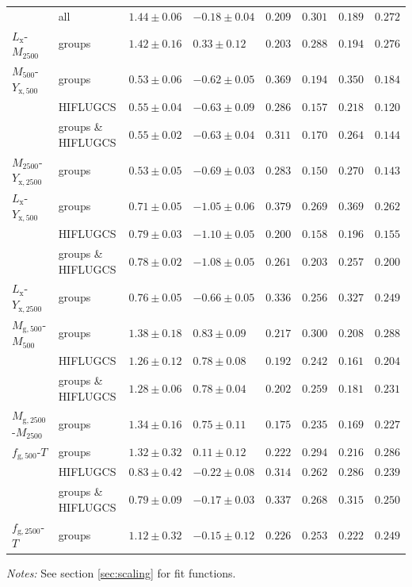 \documentclass[structabstract]{aa}
\begin{document}
\begin{table}
\begin{threeparttable}
\begin{center}
\begin{tabularx}{\linewidth}{X X XXllll}
 & all & $1.44 \pm 0.06$ & $-0.18 \pm 0.04$ & $0.209$ & $0.301$ & $0.189$ & $0.272$ \\ 
$L_{\text{x}}$-$M_{2500}$ & groups & $1.42 \pm 0.16$ & $0.33 \pm 0.12$ & $0.203$ & $0.288$ & $0.194$ & $0.276$ \\ \hline
$M_{500}$-$Y_{\text{x},500}$ & groups & $0.53 \pm 0.06$ & $-0.62 \pm 0.05$ & $0.369$ & $0.194$ & $0.350$ & $0.184$ \\ 
 & HIFLUGCS & $0.55 \pm 0.04$ & $-0.63 \pm 0.09$ & $0.286$ & $0.157$ & $0.218$ & $0.120$ \\ 
 & groups \& HIFLUGCS & $0.55 \pm 0.02$ & $-0.63 \pm 0.04$ & $0.311$ & $0.170$ & $0.264$ & $0.144$ \\ 
$M_{2500}$-$Y_{\text{x},2500}$ & groups & $0.53 \pm 0.05$ & $-0.69 \pm 0.03$ & $0.283$ & $0.150$ & $0.270$ & $0.143$ \\ \hline
$L_{\text{x}}$-$Y_{\text{x},500}$ & groups & $0.71 \pm 0.05$ & $-1.05 \pm 0.06$ & $0.379$ & $0.269$ & $0.369$ & $0.262$ \\ 
 & HIFLUGCS & $0.79 \pm 0.03$ & $-1.10 \pm 0.05$ & $0.200$ & $0.158$ & $0.196$ & $0.155$ \\ 
 & groups \& HIFLUGCS & $0.78 \pm 0.02$ & $-1.08 \pm 0.05$ & $0.261$ & $0.203$ & $0.257$ & $0.200$ \\ 
$L_{\text{x}}$-$Y_{\text{x},2500}$ & groups & $0.76 \pm 0.05$ & $-0.66 \pm 0.05$ & $0.336$ & $0.256$ & $0.327$ & $0.249$ \\ \hline 
$M_{\text{g},500}$-$M_{500}$ & groups & $1.38 \pm 0.18$ & $0.83 \pm 0.09$ & $0.217$ & $0.300$ & $0.208$ & $0.288$ \\
 & HIFLUGCS & $1.26 \pm 0.12$ & $0.78 \pm 0.08$ & $0.192$ & $0.242$ & $0.161$ & $0.204$ \\ 
 & groups \& HIFLUGCS & $1.28 \pm 0.06$ & $0.78 \pm 0.04$ & $0.202$ & $0.259$ & $0.181$ & $0.231$ \\ 
$M_{\text{g},2500}$-$M_{2500}$ & groups & $1.34 \pm 0.16$ & $0.75 \pm 0.11$ & $0.175$ & $0.235$ & $0.169$ & $0.227$ \\ \hline
$f_{\text{g},500}$-$T$ & groups & $1.32 \pm 0.32$ & $0.11 \pm 0.12$ & $0.222$ & $0.294$ & $0.216$ & $0.286$ \\ 
 & HIFLUGCS & $0.83 \pm 0.42$ & $-0.22 \pm 0.08$ & $0.314$ & $0.262$ & $0.286$ & $0.239$ \\ 
 & groups \& HIFLUGCS & $0.79 \pm 0.09$ & $-0.17 \pm 0.03$ & $0.337$ & $0.268$ & $0.315$ & $0.250$ \\ 
$f_{\text{g},2500}$-$T$ & groups & $1.12 \pm 0.32$ & $-0.15 \pm 0.12$ & $0.226$ & $0.253$ & $0.222$ & $0.249$ \\ \hline 
\end{tabularx}
 \begin{tablenotes}
\item[] \emph{Notes:} See section \ref{sec:scaling} for fit functions.
\end{tablenotes}
\end{center}
\label{tab:fits}
\end{threeparttable}
\end{table}
%
\end{document}
